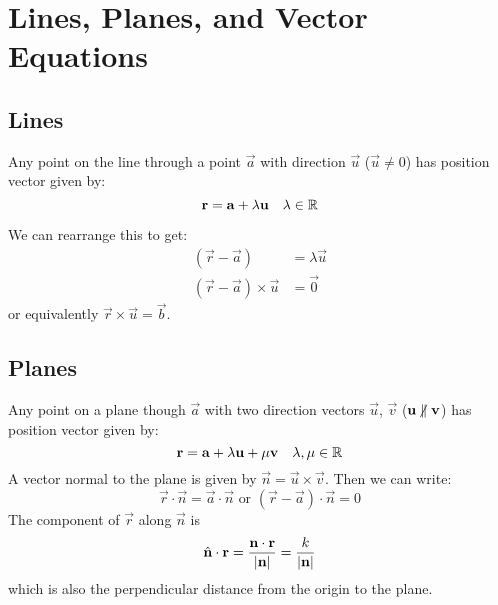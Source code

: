 \documentclass[../main.tex]{subfiles}
\begin{document}
\section{Lines, Planes, and Vector Equations}
\subsection{Lines}
Any point on the line through a point $\vec{a}$ with direction $\vec{u}$ ($\vec{u} \neq 0$) has position vector given by:
\[
  \boldsymbol{\mathbf{r}} = \boldsymbol{\mathbf{a}} + \lambda \boldsymbol{\mathbf{u}} \quad \lambda \in \mathbb{R}
\]

\begin{center}
\end{center}
We can rearrange this to get:
\begin{align*}
  (\vec{r} - \vec{a}) &= \lambda \vec{u} \\
  (\vec{r} - \vec{a}) \times \vec{u} &= \vec{0}
\end{align*}
or equivalently $\vec{r} \times \vec{u} = \vec{b}$.
\subsection{Planes}
Any point on a plane though $\vec{a}$ with two direction vectors $\vec{u}$, $\vec{v}$ ($\vec{u} \centernot\parallel \vec{v}$) has position vector given by:
\[
  \boldsymbol{\mathbf{r}} = \boldsymbol{\mathbf{a}} + \lambda \boldsymbol{\mathbf{u}} + \mu \boldsymbol{\mathbf{v}} \quad \lambda, \mu \in \mathbb{R}
\]
A vector normal to the plane is given by $\vec{n} = \vec{u} \times \vec{v}$. Then we can write:
\[
  \vec{r} \cdot \vec{n} = \vec{a} \cdot \vec{n} \text{ or } (\vec{r} - \vec{a}) \cdot \vec{n} = 0
\]
The component of $\vec{r}$ along $\vec{n}$ is
\[
  \hat{\mathbf{n}} \cdot \boldsymbol{\mathbf{r}} = \frac{\boldsymbol{\mathbf{n}} \cdot \boldsymbol{\mathbf{r}}}{|\boldsymbol{\mathbf{n}}|} = \frac{k}{|\boldsymbol{\mathbf{n}}|}
\]
which is also the perpendicular distance from the origin to the plane.
\end{document}
